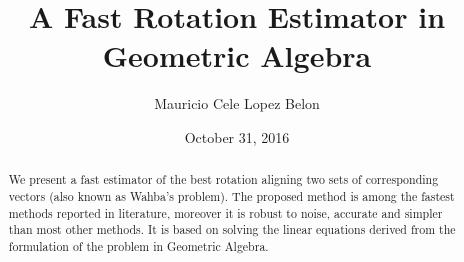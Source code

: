 \documentclass{birkjour}
\numberwithin{equation}{section}
\begin{document}
%
%
%
%
%
%
%
%
%


\title[A Fast Rotation Estimator in Geometric Algebra]
 {A Fast Rotation Estimator in Geometric Algebra}

\author[Mauricio Cele Lopez Belon]{Mauricio Cele Lopez Belon}
\address{Buenos Aires, Argentina}




\date{October 31, 2016}

\begin{abstract}

We present a fast estimator of the best rotation aligning two sets of corresponding vectors (also known as Wahba's problem). The proposed method is among the fastest methods reported in literature, moreover it is robust to noise, accurate and simpler than most other methods. It is based on solving the linear equations derived from the formulation of the problem in Geometric Algebra.

\end{abstract}

\maketitle
\end{document}
